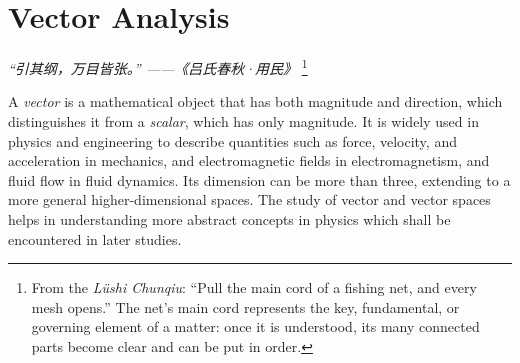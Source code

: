 \chapter{Vector Analysis}
\renewcommand{\currentchapterpath}{chapters/ch02/}

\begin{flushright}
\textit{“引其纲，万目皆张。” ——《吕氏春秋·用民》}
\footnote{From the \textit{Lüshi Chunqiu}: 
``Pull the main cord of a fishing net, and every mesh opens.'' 
The net's main cord represents the key, fundamental, 
or governing element of a matter: once it is understood, 
its many connected parts become clear and can be put in order.}
\end{flushright}


A \textit{vector} is a mathematical object that has both magnitude and direction,
which distinguishes it from a \textit{scalar}, which has only magnitude.
It is widely used in physics and engineering to describe quantities such as 
force, velocity, and acceleration in mechanics, and 
electromagnetic fields in electromagnetism, and fluid flow in fluid dynamics.
Its dimension can be more than three, 
extending to a more general higher-dimensional spaces. The study of 
vector and vector spaces helps in understanding 
more abstract concepts in physics which shall be encountered in later studies.


